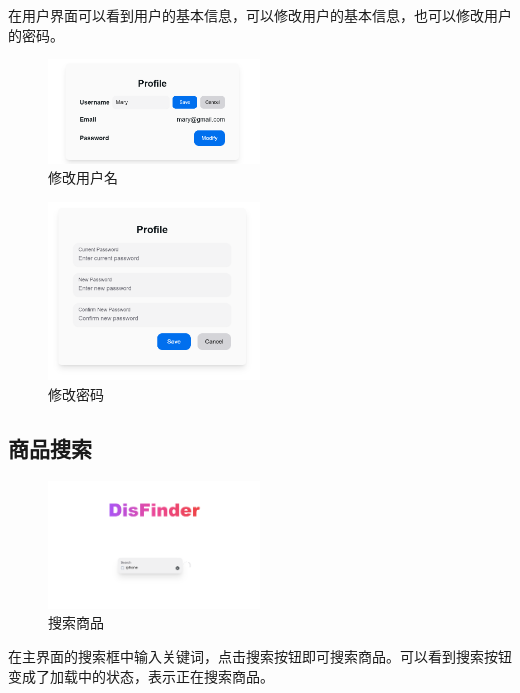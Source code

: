 在用户界面可以看到用户的基本信息，可以修改用户的基本信息，也可以修改用户的密码。

\begin{figure}[H]
\centering
\includegraphics[width=0.5\textwidth]{assets/report/change_user_info.png}
\caption{修改用户名}
\end{figure}

\begin{figure}[H]
\centering
\includegraphics[width=0.5\textwidth]{assets/report/change_password.png}
\caption{修改密码}
\end{figure}

\subsection{商品搜索}

\begin{figure}[H]
\centering
\includegraphics[width=0.5\textwidth]{assets/report/search.png}
\caption{搜索商品}
\end{figure}

在主界面的搜索框中输入关键词，点击搜索按钮即可搜索商品。可以看到搜索按钮变成了加载中的状态，表示正在搜索商品。

